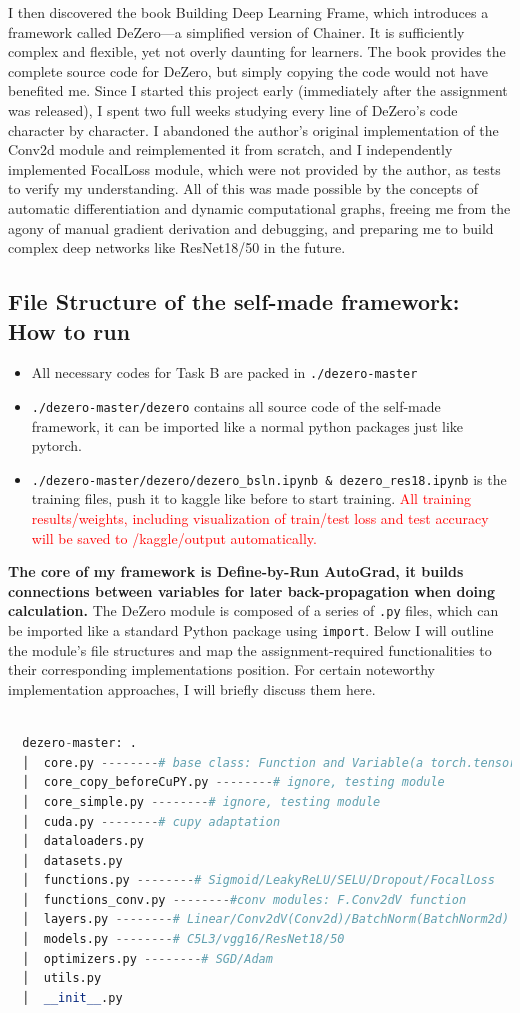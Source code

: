 \documentclass{article}
\newcommand{\subs}[1]{\subsection*{#1}}
\begin{document}
I then discovered the book Building Deep Learning Frame, which introduces a framework called DeZero—a simplified version of Chainer. It is sufficiently complex and flexible, yet not overly daunting for learners. The book provides the complete source code for DeZero, but simply copying the code would not have benefited me. Since I started this project early (immediately after the assignment was released), I spent two full weeks studying every line of DeZero's code character by character. I abandoned the author’s original implementation of the Conv2d module and reimplemented it from scratch, and I independently implemented FocalLoss module, which were not provided by the author, as tests to verify my understanding. All of this was made possible by the concepts of automatic differentiation and dynamic computational graphs, freeing me from the agony of manual gradient derivation and debugging, and preparing me to build complex deep networks like ResNet18/50 in the future.

\subs{File Structure of the self-made framework: How to run}
\begin{itemize}
  \item All necessary codes for Task B are packed in \texttt{./dezero-master}
  \item \texttt{./dezero-master/dezero} contains all source code of the self-made framework, it can be imported like a normal python packages just like pytorch.
  \item \texttt{./dezero-master/dezero/dezero\_bsln.ipynb \& dezero\_res18.ipynb} is the training files, push it to kaggle like before to start training. \textcolor{red}{All training results/weights, including visualization of train/test loss and test accuracy will be saved to /kaggle/output automatically.}
\end{itemize}
\noindent 
\textbf{The core of my framework is Define-by-Run AutoGrad, it builds connections between variables for later back-propagation when doing calculation.} The DeZero module is composed of a series of \texttt{.py} files, which can be imported like a standard Python package using \texttt{import}. Below I will outline the module's file structures and map the assignment-required functionalities to their corresponding implementations position. For certain noteworthy implementation approaches, I will briefly discuss them here.

\begin{lstlisting}[language=python]

  dezero-master: .
  │  core.py --------# base class: Function and Variable(a torch.tensor like data structure), core modules for define-by run AutoGrad
  │  core_copy_beforeCuPY.py --------# ignore, testing module
  │  core_simple.py --------# ignore, testing module
  │  cuda.py --------# cupy adaptation
  │  dataloaders.py
  │  datasets.py
  │  functions.py --------# Sigmoid/LeakyReLU/SELU/Dropout/FocalLoss
  │  functions_conv.py --------#conv modules: F.Conv2dV function
  │  layers.py --------# Linear/Conv2dV(Conv2d)/BatchNorm(BatchNorm2d)
  │  models.py --------# C5L3/vgg16/ResNet18/50
  │  optimizers.py --------# SGD/Adam
  │  utils.py
  │  __init__.py
\end{lstlisting}
\vspace{5mm}
\end{document}
